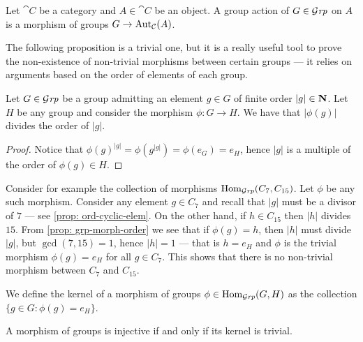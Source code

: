 \begin{definition}\label{def: grp-action}
  Let \(\cat C\) be a category and \(A \in \cat C\) be an object. A group action
  of \(G \in {\mathcal{G}\textit{rp}}\) on \(A\) is a morphism of groups \(G \to \operatorname{Aut}_{\mathcal{C}}
  (A)\).
\end{definition}

The following proposition is a trivial one, but it is a really useful tool to
prove the non-existence of non-trivial morphisms between certain groups --- it
relies on arguments based on the order of elements of each group.

\begin{proposition}\label{prop: grp-morph-order}
  Let \(G \in {\mathcal{G}\textit{rp}}\) be a group admitting an element \(g \in G\) of finite order
  \(|g| \in \mathbf{N}\). Let \(H\) be any group and consider the morphism \(\phi: G \to
  H\). We have that \(|\phi(g)|\) divides the order of \(|g|\).
\end{proposition}

\begin{proof}
  Notice that \(\phi(g)^{|g|} = \phi(g^{|g|}) = \phi(e_G) = e_H\), hence \(|g|\)
  is a multiple of the order of \(\phi(g) \in H\).
\end{proof}

\begin{example}
  Consider for example the collection of morphisms \(\operatorname{Hom}_{\mathcal{G}\textit{rp}}(C_7, C_{15})\).
  Let \(\phi\) be any such morphism. Consider any element \(g \in C_7\) and
  recall that \(|g|\) must be a divisor of \(7\) --- see \cref{prop:
  ord-cyclic-elem}. On the other hand, if \(h \in C_{15}\) then \(|h|\) divides
  \(15\). From \cref{prop: grp-morph-order} we see that if \(\phi(g) = h\), then
  \(|h|\) must divide \(|g|\), but \(\operatorname{gcd}(7, 15) = 1\), hence
  \(|h| = 1\) --- that is \(h = e_H\) and \(\phi\) is the trivial morphism
  \(\phi(g) = e_H\) for all \(g \in C_7\). This shows that there is no
  non-trivial morphism between \(C_7\) and \(C_{15}\).
\end{example}

\begin{definition}[Kernel]
  We define the kernel of a morphism of groups \(\phi \in \operatorname{Hom}_{\mathcal{G}\textit{rp}}(G, H)\) as
  the collection \(\{g \in G: \phi(g) = e_H\}\).
\end{definition}

\begin{proposition}\label{prop: ker-trivial-inj}
  A morphism of groups is injective if and only if its kernel is trivial.
\end{proposition}

